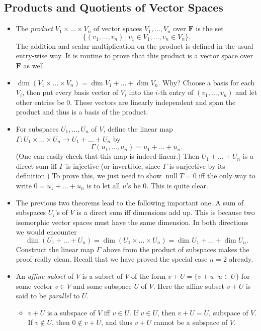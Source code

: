 \documentclass[11pt]{article}
\newcommand{\where}{\,|\,}
\newcommand{\df}[1]{\textit{\textsf{#1}}}
\newcommand{\F}{\mathbf{F}}
\newcommand{\n}{\operatorname{null}}
\renewcommand{\d}{\dim}
\begin{document}
\subsection{Products and Quotients of Vector Spaces}
\begin{itemize}
    \item The \df{product} $V_1 \times \dots \times V_n$ of vector spaces $V_1,\dots,V_n$ over $\F$ is the set $$\{(v_1,\dots,v_n) \where v_1 \in V_1,\dots, v_n \in V_n\}.$$ The addition and scalar multiplication on the product is defined in the usual entry-wise way. It is routine to prove that this product is a vector space over $\F$ as well.
    \item $\d (V_1\times \dots \times V_n) = \d V_1 + \dots + \d V_n$. Why? Choose a basis for each $V_i$, then put every basis vector of $V_i$ into the $i$-th entry of $(v_1,\dots,v_n)$ and let other entries be 0. These vectors are linearly independent and span the product and thus is a basis of the product.
    \item For subspaces $U_1,\dots,U_n$ of $V$, define the linear map $\Gamma: U_1 \times \dots \times U_n \to U_1 + \dots + U_n$ by $$\Gamma(u_1,\dots,u_n) = u_1+\dots+u_n.$$ (One can easily check that this map is indeed linear.) Then $U_1+\dots+U_n$ is a direct sum iff $\Gamma$ is injective (or invertible, since $\Gamma$ is surjective by its definition.) To prove this, we just need to show $\n T = {0}$ iff the only way to write $0 = u_1+\dots+u_n$ is to let all $u$'s be 0. This is quite clear.
    \item The previous two theorems lead to the following important one. A sum of subspaces $U_i$'s of $V$ is a direct sum iff dimensions add up. This is because two isomorphic vector spaces must have the same dimension. In both directions we would encounter $$\d (U_1+\dots+U_n) = \d (U_1 \times \dots \times U_n) = \d U_1 + \dots + \d U_n.$$
    Construct the linear map $\Gamma$ above from the product of subspaces makes the proof really clean. Recall that we have proved the special case $n=2$ already.
    \item An \df{affine subset} of $V$ is a subset of $V$ of the form $v+U = \{v+u \where u \in U\}$ for some vector $v \in V$ and some subspace $U$ of $V$. Here the affine subset $v+U$ is said to be \df{parallel} to $U$.
    \begin{itemize}
        \item $v+U$ is a subspace of $V$ iff $v \in U$. If $v \in U$, then $v+U = U$, subspace of $V$. If $v \notin U$, then $0 \notin v+U$, and thus $v+U$ cannot be a subspace of $V$.

\end{itemize}
\end{itemize}
\end{document}
